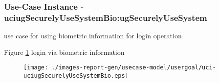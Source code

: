 
	\subsubsection{Use-Case Instance - uciugSecurelyUseSystemBio:ugSecurelyUseSystem}
	
	use case for using biometric information for login operation		  
	\begin{operationmodel}
	
	\end{operationmodel} 

	
	Figure \ref{fig:lu.uni.lassy.excalibur.examples.icrash-RE-UC-uci-uciugSecurelyUseSystemBio}
	login via biometric information
	
	\begin{figure}[htbp]
	\begin{center}
	
	\texttt{[image: ./images-report-gen/usecase-model/usergoal/uci-uciugSecurelyUseSystemBio.eps]}
	\end{center}
	\caption[lu.uni.lassy.excalibur.examples.icrash Sequence Diagram: uci-uciugSecurelyUseSystemBio]{}
	\label{fig:lu.uni.lassy.excalibur.examples.icrash-RE-UC-uci-uciugSecurelyUseSystemBio}
	\end{figure}
	\vspace{0.5cm}
